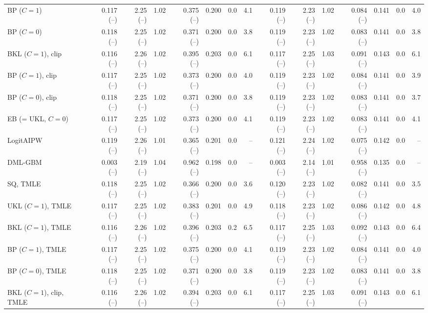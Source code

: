 \begin{tabular}{lrrrrrrrrrrrrrr}
BP ($C=1$) & 0.117 (--) & 2.25 (--) & 1.02 & 0.375 (--) & 0.200 & 0.0 & 4.1 & 0.119 (--) & 2.23 (--) & 1.02 & 0.084 (--) & 0.141 & 0.0 & 4.0 \\
BP ($C=0$) & 0.118 (--) & 2.25 (--) & 1.02 & 0.371 (--) & 0.200 & 0.0 & 3.8 & 0.119 (--) & 2.23 (--) & 1.02 & 0.083 (--) & 0.141 & 0.0 & 3.8 \\
BKL ($C=1$), clip & 0.116 (--) & 2.26 (--) & 1.02 & 0.395 (--) & 0.203 & 0.0 & 6.1 & 0.117 (--) & 2.25 (--) & 1.03 & 0.091 (--) & 0.143 & 0.0 & 6.1 \\
BP ($C=1$), clip & 0.117 (--) & 2.25 (--) & 1.02 & 0.373 (--) & 0.200 & 0.0 & 4.0 & 0.119 (--) & 2.23 (--) & 1.02 & 0.084 (--) & 0.141 & 0.0 & 3.9 \\
BP ($C=0$), clip & 0.118 (--) & 2.25 (--) & 1.02 & 0.371 (--) & 0.200 & 0.0 & 3.8 & 0.119 (--) & 2.23 (--) & 1.02 & 0.083 (--) & 0.141 & 0.0 & 3.7 \\
EB (= UKL, $C=0$) & 0.117 (--) & 2.25 (--) & 1.02 & 0.373 (--) & 0.200 & 0.0 & 4.1 & 0.119 (--) & 2.23 (--) & 1.02 & 0.083 (--) & 0.141 & 0.0 & 4.1 \\
LogitAIPW & 0.119 (--) & 2.26 (--) & 1.01 & 0.365 (--) & 0.201 & 0.0 & -- & 0.121 (--) & 2.24 (--) & 1.02 & 0.075 (--) & 0.142 & 0.0 & -- \\
DML-GBM & 0.003 (--) & 2.19 (--) & 1.04 & 0.962 (--) & 0.198 & 0.0 & -- & 0.003 (--) & 2.14 (--) & 1.01 & 0.958 (--) & 0.135 & 0.0 & -- \\
SQ, TMLE & 0.118 (--) & 2.25 (--) & 1.02 & 0.366 (--) & 0.200 & 0.0 & 3.6 & 0.120 (--) & 2.23 (--) & 1.02 & 0.082 (--) & 0.141 & 0.0 & 3.5 \\
UKL ($C=1$), TMLE & 0.117 (--) & 2.25 (--) & 1.02 & 0.383 (--) & 0.201 & 0.0 & 4.9 & 0.118 (--) & 2.23 (--) & 1.02 & 0.086 (--) & 0.142 & 0.0 & 4.8 \\
BKL ($C=1$), TMLE & 0.116 (--) & 2.26 (--) & 1.02 & 0.396 (--) & 0.203 & 0.2 & 6.5 & 0.117 (--) & 2.25 (--) & 1.03 & 0.092 (--) & 0.143 & 0.0 & 6.4 \\
BP ($C=1$), TMLE & 0.117 (--) & 2.25 (--) & 1.02 & 0.375 (--) & 0.200 & 0.0 & 4.1 & 0.119 (--) & 2.23 (--) & 1.02 & 0.084 (--) & 0.141 & 0.0 & 4.0 \\
BP ($C=0$), TMLE & 0.118 (--) & 2.25 (--) & 1.02 & 0.371 (--) & 0.200 & 0.0 & 3.8 & 0.119 (--) & 2.23 (--) & 1.02 & 0.083 (--) & 0.141 & 0.0 & 3.8 \\
BKL ($C=1$), clip, TMLE & 0.116 (--) & 2.26 (--) & 1.02 & 0.394 (--) & 0.203 & 0.0 & 6.1 & 0.117 (--) & 2.25 (--) & 1.03 & 0.091 (--) & 0.143 & 0.0 & 6.1 \\

\end{tabular}
